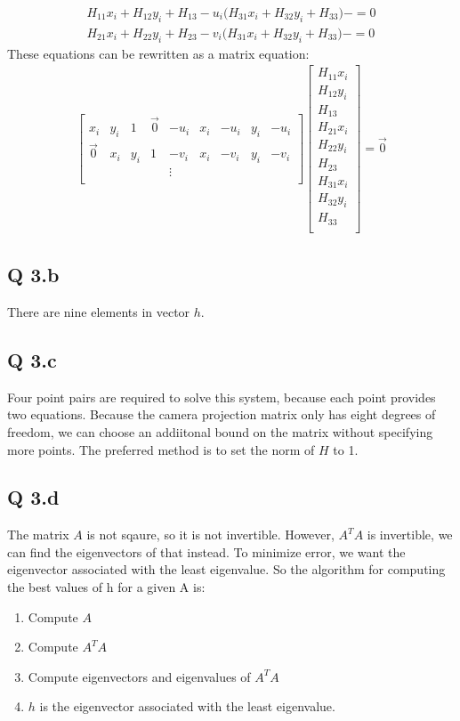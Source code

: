 \documentclass[11pt]{article}
\begin{document}
\begin{align}
H_{11}x_i + H_{12}y_i + H_{13} -u_i\big(H_{31}x_i + H_{32}y_i + H_{33}\big) - =0
\\
H_{21}x_i + H_{22}y_i + H_{23} -v_i\big(H_{31}x_i + H_{32}y_i + H_{33}\big) - =0
\end{align}
These equations can be rewritten as a matrix equation:  
\begin{align}
    \begin{bmatrix}
        x_i & y_i & 1 & \vec{0} & -u_i & x_i & -u_i & y_i & -u_i \\
        \vec{0} & x_i & y_i & 1 & -v_i & x_i & -v_i & y_i & -v_i \\
                &     &     &   &\vdots&     &      &     &      \\
    \end{bmatrix}
    \begin{bmatrix}
        H_{11}x_i \\ H_{12}y_i \\ H_{13}\\
        H_{21}x_i \\ H_{22}y_i \\ H_{23}\\
        H_{31}x_i \\ H_{32}y_i \\ H_{33}\\
    \end{bmatrix}
    =
    \vec{0}
\end{align}
\subsection*{Q 3.b}
There are nine elements in vector $h$. 
\subsection*{Q 3.c}
Four point pairs are required to solve this system, because each point provides two equations.
Because the camera projection matrix only has eight degrees of freedom, we can choose an addiitonal
bound on the matrix without specifying more points. The preferred method is to set the norm
of $H$ to 1.
\subsection*{Q 3.d}
The matrix $A$ is not sqaure, so it is not invertible. However, $A^TA$ is invertible, we can find
the eigenvectors of that instead. To minimize error, we want the eigenvector associated with the 
least eigenvalue. So the algorithm for computing the best values of h for a given A is:
\begin{enumerate}
    \item Compute $A$
    \item Compute $A^TA$
    \item Compute eigenvectors and eigenvalues of $A^TA$
    \item $h$ is the eigenvector associated with the least eigenvalue.
\end{enumerate}
\end{document}
